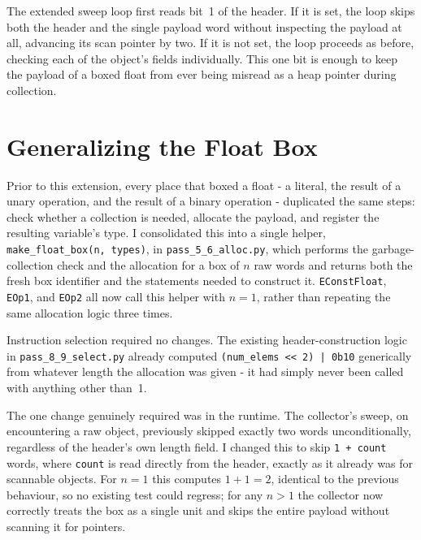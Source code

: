 The extended sweep loop first reads bit~1 of the header. If it is set, the loop skips both the header and the single payload word without inspecting the payload at all, advancing its scan pointer by two. If it is not set, the loop proceeds as before, checking each of the object's fields individually. This one bit is enough to keep the payload of a boxed float from ever being misread as a heap pointer during collection.

\section{Generalizing the Float Box}

Prior to this extension, every place that boxed a float - a literal, the result of a unary operation, and the result of a binary operation - duplicated the same steps: check whether a collection is needed, allocate the payload, and register the resulting variable's type. I consolidated this into a single helper, \texttt{make\_float\_box(n, types)}, in \texttt{pass\_5\_6\_alloc.py}, which performs the garbage-collection check and the allocation for a box of $n$ raw words and returns both the fresh box identifier and the statements needed to construct it. \texttt{EConstFloat}, \texttt{EOp1}, and \texttt{EOp2} all now call this helper with $n=1$, rather than repeating the same allocation logic three times.

Instruction selection required no changes. The existing header-construction logic in \texttt{pass\_8\_9\_select.py} already computed \texttt{(num\_elems~<<~2)~|~0b10} generically from whatever length the allocation was given - it had simply never been called with anything other than~1.

The one change genuinely required was in the runtime. The collector's sweep, on encountering a raw object, previously skipped exactly two words unconditionally, regardless of the header's own length field. I changed this to skip \texttt{1~+~count} words, where \texttt{count} is read directly from the header, exactly as it already was for scannable objects. For $n=1$ this computes $1+1=2$, identical to the previous behaviour, so no existing test could regress; for any $n>1$ the collector now correctly treats the box as a single unit and skips the entire payload without scanning it for pointers.